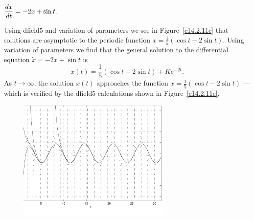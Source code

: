 \documentclass{ximera}
\begin{document}
\begin{computerExercise}   \label{c14.2.11c}
$\displaystyle\frac{dx}{dt} = -2 x + \sin t$.

\begin{solution}

Using {\sf dfield5} and variation of parameters we see in 
Figure~\ref{c14.2.11c} that solutions are asymptotic to the
periodic function $x=\frac{1}{5}(\cos t-2\sin t)$.
Using variation of parameters we find that the general solution to the
differential equation $\dot{x}=-2x+\sin t$ is 
\[
x(t) = \frac{1}{5}(\cos t-2\sin t) + Ke^{-2t}.
\]
As $t\to\infty$, the solution $x(t)$ approaches the function  
$x= \frac{1}{5}(\cos t-2\sin t)$ --- which is verified by the 
{\sf dfield5} calculations shown in Figure~\ref{c14.2.11c}.

\begin{figure}[htb]
     \centerline{%
     \includegraphics[width=3.0in]{exfigure/fig17-1-13.pdf}}
\end{figure} 



\end{solution}
\end{computerExercise}
\end{document}
